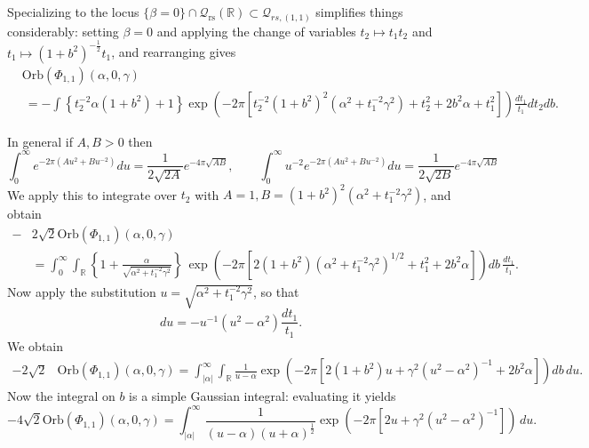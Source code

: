 \documentclass[reqno, 11pt]{amsart} %
\numberwithin{equation}{section}
\theoremstyle{plain}
\theoremstyle{definition}
\theoremstyle{remark}
\newcommand{\mr}{\mathrm}
\newcommand{\rs}{\mr{rs}}
\newcommand{\bbR}{\mathbb R}
\newcommand{\calQ}{\mathcal Q}
\newcommand{\Orb}{\mathrm{Orb}}
\begin{document}
Specializing to the locus $\{ \beta = 0 \} \cap \calQ_\rs(\bbR) \subset \calQ_{rs, (1,1)}$ simplifies things considerably: setting $\beta =0$ and applying the change of variables  $t_2 \mapsto t_1 t_2$ and $t_1 \mapsto (1+b^2)^{-\frac12} t_1$, and rearranging gives
\begin{align*}
&\Orb(\Phi_{1,1})(\alpha, 0, \gamma) \\
& \ = -  \int \left\{  t_2^{-2} \alpha(1+b^2) + 1    \right\}   \exp \left( -2 \pi \left[ t_2^{-2}    (1+b^2)^2 (\alpha^2 + t_1^{-2}\gamma^2)   + t_2^2 + 2 b^2 \alpha  + t_1^2  \right] \right) \frac{dt_1}{t_1} dt_2 db.
\end{align*}

In general if $A,B>0$ then
\begin{equation} \label{eqn:Gaussian master thm}
\int_0^{\infty} e^{- 2\pi (Au^2 + Bu^{-2})}du = \frac{1}{2\sqrt{2A}} e^{-4 \pi \sqrt{AB}}, \qquad \int_0^{\infty} u^{-2} e^{-2\pi(Au^2 + B u^{-2})} du = \frac1{2 \sqrt{2B}} e^{-4 \pi \sqrt{AB}}
\end{equation}
We apply this to integrate over $t_2$  with $A = 1, B = (1+b^2)^2(\alpha^2 + t_1^{-2} \gamma^2)$, and obtain
\begin{align*}
-& 2 \sqrt 2\Orb(\Phi_{1,1})(\alpha, 0, \gamma) \\
& =  \int_{0}^{\infty} \int_{ \mathbb R}  \left\{1 + \frac{\alpha}{ \sqrt{\alpha^2 + t_1^{-2} \gamma^2 }}    \right\} \, \exp \left( -2 \pi \left[2 (1+b^2) (\alpha^2 + t_1^{-2}\gamma^2)^{1/2} + t_1^{2} + 2 b^2\alpha \right] \right)db \,  \frac{dt_1}{t_1}.
\end{align*}
Now apply the substitution $u = \sqrt{\alpha^2 + t_1^{-2} \gamma^2}$, so that
\[
du = - u^{-1} (u^2 - \alpha^2) \frac{dt_1}{t_1}.
\]
We obtain
\begin{align*}
-2 \sqrt 2 & \Orb(\Phi_{1,1})(\alpha,0,\gamma)  = \int_{|\alpha|}^{\infty} \int_{\bbR} \frac{1}{u-\alpha} \exp \left( - 2 \pi \left[ 2 (1+b^2) u + \gamma^2(u^2-\alpha^2)^{-1} + 2b^2 \alpha \right] \right) db \, du.
\end{align*}
Now the integral on $b$ is a simple Gaussian integral: evaluating it yields
\begin{equation} \label{eqn:GL2 orb b=0 final}
-4 \sqrt 2\Orb(\Phi_{1,1} ) (\alpha, 0, \gamma) =  \int_{|\alpha|}^{\infty} \frac{1}{(u-\alpha)(u+\alpha)^{\frac12}} \exp \left( - 2 \pi \left[ 2u + \gamma^2(u^2 - \alpha^2)^{-1} \right] \right) \, du.
\end{equation}
\end{document}
